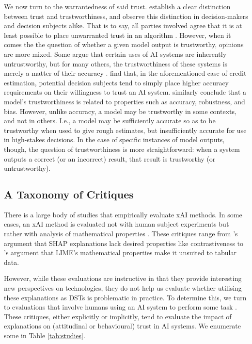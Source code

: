 We now turn to the warrantedness of said trust. \textcite{Vereschak_Alizadeh_Bailly_Caramiaux_2024} establish a clear distinction between trust and trustworthiness, and observe this distinction in decision-makers and decision subjects alike. That is to say, all parties involved agree that it is at least possible to place unwarranted trust in an algorithm \cite{Vereschak_Alizadeh_Bailly_Caramiaux_2024}. However, when it comes the the question of whether a given model output is trustworthy, opinions are more mixed. Some argue that certain uses of AI systems are inherently untrustworthy, but for many others, the trustworthiness of these systems is merely a matter of their accuracy \cite{Rebitschek_Gigerenzer_Wagner_2021}. \textcite{Rebitschek_Gigerenzer_Wagner_2021} find that, in the aforementioned case of credit estimation, potential decision subjects tend to simply place higher accuracy requirements on their willingness to trust an AI system. \textcite{jacovi_formalizing_2021} similarly conclude that a model's trustworthiness is related to properties such as accuracy, robustness, and bias. However, unlike accuracy, a model may be trustworthy in some contexts, and not in others. I.e., a model may be sufficiently accurate so as to be trustworthy when used to give rough estimates, but insufficiently accurate for use in high-stakes decisions. In the case of specific instances of model outputs, though, the question of trustworthiness is more straightforward: when a system outputs a correct (or an incorrect) result, that result is trustworthy (or untrustworthy).

\subsection{A Taxonomy of Critiques}
There is a large body of studies that empirically evaluate xAI methods. In some cases, an xAI method is evaluated not with human subject experiments but rather with analysis of mathematical properties \cite{doshi-velez_towards_2017}. These critiques range from \textcite{kumar_problems_2020}'s argument that SHAP explanations lack desired properties like contrastiveness to \textcite{lundberg_unified_2017}'s argument that LIME's mathematical properties make it unsuited to tabular data.

However, while these evaluations are instructive in that they provide interesting new perspectives on technologies, they do not help us evaluate whether utilising these explanations as DSTs is problematic in practice. To determine this, we turn to evaluations that involve humans using an AI system to perform some task \cite{ribeiro_why_2016,ribeiro_anchors_2018, rader_explanations_2018, jacobs_how_2021, bansal_does_2021}. These critiques, either explicitly or implicitly, tend to evaluate the impact of explanations on (attitudinal or behavioural) trust in AI systems. We enumerate some in Table \ref{tab:studies}.

